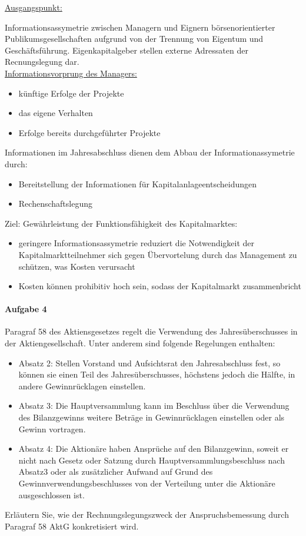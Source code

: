 \documentclass[paper=a4, fontsize=11pt]{scrartcl}
\numberwithin{equation}{section}
\numberwithin{figure}{section}
\numberwithin{table}{section}
\begin{document}
\underline{Ausgangspunkt:}

Informationsassymetrie zwischen Managern und Eignern börsenorientierter Publikumsgesellschaften aufgrund von der Trennung von Eigentum und Geschäftsführung.
Eigenkapitalgeber stellen externe Adressaten der Recnungslegung dar. \\

\underline{Informationsvorprung des Managers:}

\begin{itemize}
  \item künftige Erfolge der Projekte
  \item das eigene Verhalten
  \item Erfolge bereits durchgeführter Projekte
\end{itemize}

Informationen im Jahresabschluss dienen dem Abbau der Informationassymetrie durch:

\begin{itemize}
  \item Bereitstellung der Informationen für Kapitalanlageentscheidungen
  \item Rechenschaftslegung
\end{itemize}

Ziel: Gewährleistung der Funktionsfähigkeit des Kapitalmarktes:

\begin{itemize}
  \item geringere Informationsassymetrie reduziert die Notwendigkeit der Kapitalmarktteilnehmer
  sich gegen Übervortelung durch das Management zu schützen, was Kosten verursacht
  \item Kosten können prohibitiv hoch sein, sodass der Kapitalmarkt zusammenbricht
\end{itemize}

\paragraph{Aufgabe 4}
Paragraf 58 des Aktiensgesetzes regelt die Verwendung des Jahresüberschusses in der Aktiengesellschaft. Unter anderem sind folgende Regelungen enthalten:
\begin{itemize}
\item Absatz 2: Stellen Vorstand und Aufsichtsrat den Jahresabschluss fest, so können sie einen Teil des Jahresüberschusses, höchstens jedoch die Hälfte, in andere Gewinnrücklagen einstellen.
\item Absatz 3: Die Hauptversammlung kann im Beschluss über die Verwendung des Bilanzgewinns weitere Beträge in Gewinnrücklagen einstellen oder als Gewinn vortragen.
\item Absatz 4: Die Aktionäre haben Ansprüche auf den Bilanzgewinn, soweit er nicht nach Gesetz oder Satzung durch Hauptversammlungsbeschluss nach Absatz3 oder als zusätzlicher Aufwand auf Grund des Gewinnverwendungsbeschlusses von der Verteilung unter die Aktionäre ausgeschlossen ist.
\end{itemize}
Erläutern Sie, wie der Rechnungslegungszweck der Anspruchsbemessung durch Paragraf 58 AktG konkretisiert wird. \\
\end{document}
